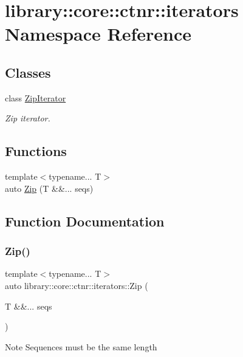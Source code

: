 \hypertarget{namespacelibrary_1_1core_1_1ctnr_1_1iterators}{}\section{library\+::core\+::ctnr\+::iterators Namespace Reference}
\label{namespacelibrary_1_1core_1_1ctnr_1_1iterators}
\subsection*{Classes}
\begin{DoxyCompactItemize}
\item 
class \mbox{\hyperlink{classlibrary_1_1core_1_1ctnr_1_1iterators_1_1_zip_iterator}{Zip\+Iterator}}
\begin{DoxyCompactList}\small\item\em Zip iterator. \end{DoxyCompactList}\end{DoxyCompactItemize}
\subsection*{Functions}
\begin{DoxyCompactItemize}
\item 
{\footnotesize template$<$typename... T$>$ }\\auto \mbox{\hyperlink{namespacelibrary_1_1core_1_1ctnr_1_1iterators_a42406e4b2d99c4ff14d1412f15674788}{Zip}} (T \&\&... seqs)
\end{DoxyCompactItemize}


\subsection{Function Documentation}
\mbox{\label{namespacelibrary_1_1core_1_1ctnr_1_1iterators_a42406e4b2d99c4ff14d1412f15674788}} 
\subsubsection{\texorpdfstring{Zip()}{Zip()}}
{\footnotesize\ttfamily template$<$typename... T$>$ \\
auto library\+::core\+::ctnr\+::iterators\+::\+Zip (\begin{DoxyParamCaption}\item[{T \&\&...}]{seqs }\end{DoxyParamCaption})}

\begin{DoxyNote}{Note}
Sequences must be the same length 
\end{DoxyNote}
